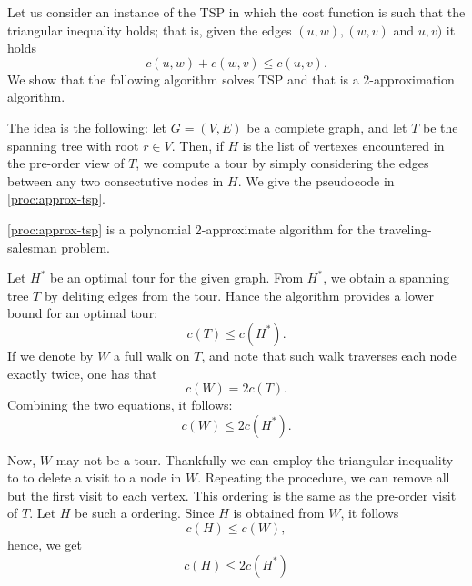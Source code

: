 \documentclass{subfiles}
\begin{document}
    Let us consider an instance of the TSP in which the cost function is such that the 
        triangular inequality holds; that is, given the edges \((u, w), (w, v)\) and \(u, v)\)
        it holds 
        \[
            c(u, w) + c(w, v) \le c(u, v).
        \]
        We show that the following algorithm solves TSP and 
        that is a 2-approximation algorithm.

    The idea is the following: let \(G = (V, E)\) be a complete graph,
        and let \(T\) be the spanning tree with root \(r \in V\). 
        Then, if \(H\) is the list of vertexes encountered in the pre-order view of \(T\),
        we compute a tour by simply considering the edges between any two consectutive 
        nodes in \(H\). We give the pseudocode in \autoref{proc:approx-tsp}.

        

    \begin{theorem*}
        \autoref{proc:approx-tsp} is a polynomial 2-approximate algorithm for the 
            traveling-salesman problem.
    \end{theorem*}

    \begin{proof*}
        Let \(H^{*}\) be an optimal tour for the given graph.
            From \(H^{*}\), we obtain a spanning tree \(T\) by deliting edges from the tour.
            Hance the algorithm provides a lower bound for an optimal tour:
            \[
                c(T) \le c(H^{*}).
            \]
            If we denote by \(W\) a full walk on \(T\),
                and note that such walk traverses each node exactly twice,
                one has that 
            \[
                c(W) = 2c(T).
            \]
            Combining the two equations, it follows:
            \[
                c(W) \le 2c(H^{*}).
            \]

        Now, \(W\) may not be a tour. Thankfully we can employ the triangular inequality to 
            to delete a visit to a node in \(W\). Repeating the procedure,
            we can remove all but the first visit to each vertex.
            This ordering is the same as the pre-order visit of \(T\).
            Let \(H\) be such a ordering. Since \(H\) is obtained from \(W\),
            it follows
            \[
                c(H) \le c(W),
            \]
            hence, we get 
            \[
                c(H) \le 2c(H^{*})
            \]
    \end{proof*}
\end{document}
